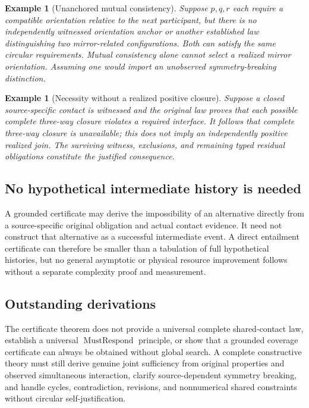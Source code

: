 \documentclass[11pt]{article}
\newtheorem{example}[definition]{Example}
\begin{document}
\begin{example}[Unanchored mutual consistency]
Suppose $p,q,r$ each require a compatible orientation
relative to the next participant, but there is no
independently witnessed orientation anchor or another
established law distinguishing two mirror-related
configurations. Both can satisfy the same circular
requirements. Mutual consistency alone cannot select
a realized mirror orientation. Assuming one would import
an unobserved symmetry-breaking distinction.
\end{example}

\begin{example}[Necessity without a realized positive closure]
Suppose a closed source-specific contact is witnessed and
the original law proves that each possible complete
three-way closure violates a required interface. It follows
that complete three-way closure is unavailable; this
does not imply an independently positive realized join.
The surviving witness, exclusions, and remaining typed
residual obligations constitute the justified consequence.
\end{example}

\subsection{No hypothetical intermediate history is needed}
A grounded certificate may derive the impossibility of
an alternative directly from a source-specific original
obligation and actual contact evidence. It need not
construct that alternative as a successful intermediate
event. A direct entailment certificate can therefore be
smaller than a tabulation of full hypothetical histories,
but no general asymptotic or physical resource improvement
follows without a separate complexity proof and measurement.

\subsection{Outstanding derivations}
The certificate theorem does not provide a universal
complete shared-contact law, establish a universal
$\operatorname{MustRespond}$ principle, or show that a
grounded coverage certificate can always be obtained
without global search. A complete constructive theory
must still derive genuine joint sufficiency from original
properties and observed simultaneous interaction, clarify
source-dependent symmetry breaking, and handle cycles,
contradiction, revisions, and nonnumerical shared constraints
without circular self-justification.
\end{document}

